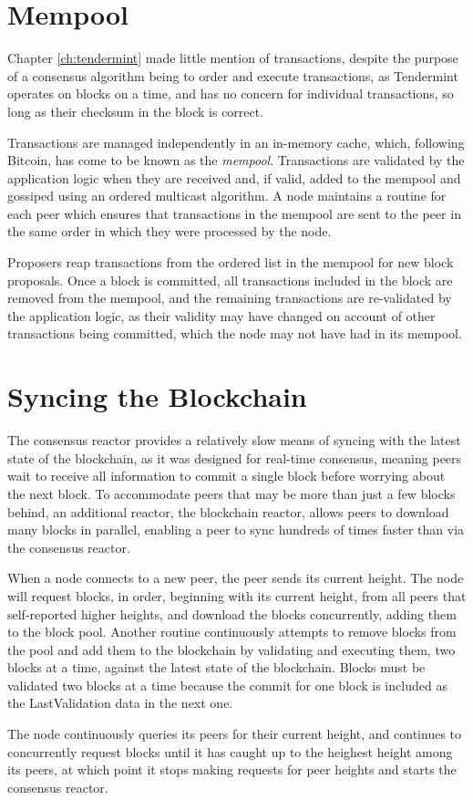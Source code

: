 \section{Mempool}

Chapter \ref{ch:tendermint} made little mention of transactions, 
despite the purpose of a consensus algorithm being to order and execute transactions,
as Tendermint operates on blocks on a time, and has no concern for individual transactions,
so long as their checksum in the block is correct.

Transactions are managed independently in an in-memory cache, 
which, following Bitcoin, has come to be known as the \emph{mempool}.
Transactions are validated by the application logic when they are received and, if valid, 
added to the mempool and gossiped using an ordered multicast algorithm.
A node maintains a routine for each peer which ensures that transactions 
in the mempool are sent to the peer in the same order in which they were processed by the node.

Proposers reap transactions from the ordered list in the mempool for new block proposals.
Once a block is committed, all transactions included in the block are removed from the mempool,
and the remaining transactions are re-validated by the application logic,
as their validity may have changed on account of other transactions being committed, 
which the node may not have had in its mempool.

\section{Syncing the Blockchain}

The consensus reactor provides a relatively slow means of syncing with the latest state of the blockchain,
as it was designed for real-time consensus,
meaning peers wait to receive all information to commit a single block before worrying about the next block.
To accommodate peers that may be more than just a few blocks behind, 
an additional reactor, the blockchain reactor, allows peers to download many blocks in parallel,
enabling a peer to sync hundreds of times faster than via the consensus reactor.

When a node connects to a new peer, the peer sends its current height.
The node will request blocks, in order, beginning with its current height,
from all peers that self-reported higher heights, and download the blocks concurrently, adding them to the block pool.
Another routine continuously attempts to remove blocks from the pool and add them to the blockchain by validating and executing them, 
two blocks at a time, against the latest state of the blockchain.
Blocks must be validated two blocks at a time because the commit for one block is included as the LastValidation data in the next one.

The node continuously queries its peers for their current height, 
and continues to concurrently request blocks until it has caught up to the heighest height among its peers, 
at which point it stops making requests for peer heights and starts the consensus reactor.

